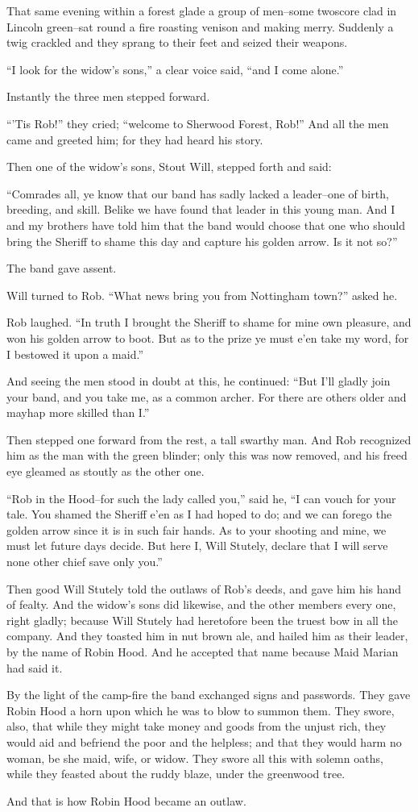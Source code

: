 That same evening within a forest glade a group of men--some twoscore
clad in Lincoln green--sat round a fire roasting venison and making
merry. Suddenly a twig crackled and they sprang to their feet and seized
their weapons.

``I look for the widow's sons,'' a clear voice said, ``and I come
alone.''

Instantly the three men stepped forward.

``'Tis Rob!'' they cried; ``welcome to Sherwood Forest, Rob!'' And all
the men came and greeted him; for they had heard his story.

Then one of the widow's sons, Stout Will, stepped forth and said:

``Comrades all, ye know that our band has sadly lacked a leader--one of
birth, breeding, and skill. Belike we have found that leader in this
young man. And I and my brothers have told him that the band would
choose that one who should bring the Sheriff to shame this day and
capture his golden arrow. Is it not so?''

The band gave assent.

Will turned to Rob. ``What news bring you from Nottingham town?'' asked
he.

Rob laughed. ``In truth I brought the Sheriff to shame for mine own
pleasure, and won his golden arrow to boot. But as to the prize ye must
e'en take my word, for I bestowed it upon a maid.''

And seeing the men stood in doubt at this, he continued: ``But I'll
gladly join your band, and you take me, as a common archer. For there
are others older and mayhap more skilled than I.''

Then stepped one forward from the rest, a tall swarthy man. And Rob
recognized him as the man with the green blinder; only this was now
removed, and his freed eye gleamed as stoutly as the other one.

``Rob in the Hood--for such the lady called you,'' said he, ``I can
vouch for your tale. You shamed the Sheriff e'en as I had hoped to do;
and we can forego the golden arrow since it is in such fair hands. As to
your shooting and mine, we must let future days decide. But here I, Will
Stutely, declare that I will serve none other chief save only you.''

Then good Will Stutely told the outlaws of Rob's deeds, and gave him his
hand of fealty. And the widow's sons did likewise, and the other members
every one, right gladly; because Will Stutely had heretofore been the
truest bow in all the company. And they toasted him in nut brown ale,
and hailed him as their leader, by the name of Robin Hood. And he
accepted that name because Maid Marian had said it.

By the light of the camp-fire the band exchanged signs and passwords.
They gave Robin Hood a horn upon which he was to blow to summon them.
They swore, also, that while they might take money and goods from the
unjust rich, they would aid and befriend the poor and the helpless; and
that they would harm no woman, be she maid, wife, or widow. They swore
all this with solemn oaths, while they feasted about the ruddy blaze,
under the greenwood tree.

And that is how Robin Hood became an outlaw.
